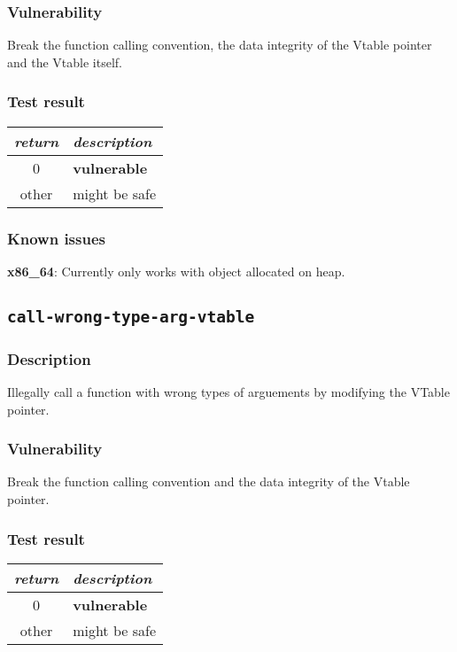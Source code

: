\documentclass[a4paper]{book}
\begin{document}
\subsubsection{Vulnerability}
Break the function calling convention, the data integrity of the Vtable pointer and the Vtable itself.

\subsubsection{Test result}
\begin{tabular}{cl}
  \toprule
  \emph{return}  & \emph{description} \\
  \midrule
  0              & \textbf{vulnerable} \\
  other          & might be safe \\
  \bottomrule
\end{tabular}

\subsubsection{Known issues}
\textbf{x86\_64}: Currently only works with object allocated on heap.

\newpage
\subsection{\texttt{call-wrong-type-arg-vtable}}\label{test-call-wrong-type-arg-vtable}

\subsubsection{Description}
Illegally call a function with wrong types of arguements by modifying the VTable pointer.

\subsubsection{Vulnerability}
Break the function calling convention and the data integrity of the Vtable pointer.

\subsubsection{Test result}
\begin{tabular}{cl}
  \toprule
  \emph{return}  & \emph{description} \\
  \midrule
  0              & \textbf{vulnerable} \\
  other          & might be safe \\
  \bottomrule
\end{tabular}
\end{document}
